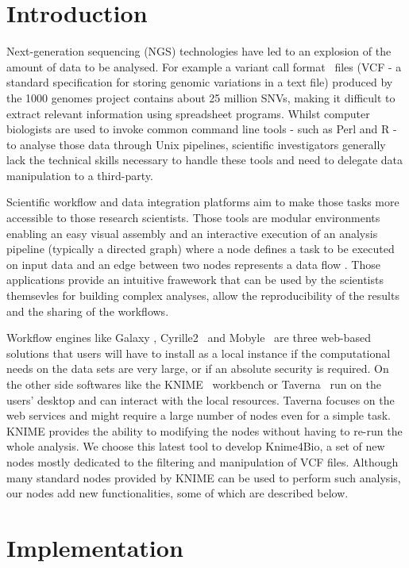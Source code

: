\documentclass{bioinfo}
\begin{document}
\section{Introduction}

Next-generation sequencing (NGS) technologies have led to an explosion of the amount of data to be analysed. For example a variant call format~\citep{pmid21653522} files (VCF - a standard specification for storing genomic variations in a text file)  produced by the 1000 genomes project contains about 25 million SNVs, making it difficult to extract relevant information using spreadsheet programs. Whilst computer biologists are used to invoke common command line tools - such as Perl and R - to analyse those data through Unix pipelines, scientific investigators generally lack the technical skills necessary to handle these tools and need to delegate data manipulation to a third-party. 

Scientific workflow and data integration platforms aim to make those tasks more accessible to those research scientists. Those tools are modular environments enabling an easy visual assembly and an interactive execution of an analysis pipeline (typically a directed graph) where a node defines a task to be executed on input data and an edge between two nodes represents a data flow . Those applications provide an intuitive frawework that can be used by the scientists themsevles for building complex analyses, allow the reproducibility of the results and the sharing of the workflows.

Workflow engines like Galaxy \citep{pmid21531983}, Cyrille2~\citep{pmid18269742} and Mobyle~\citep{pmid19689959} are three web-based solutions that users will have to install as a local instance if the computational needs on the data sets are very large, or if an absolute security is required. On the other side softwares like the KNIME~\citep{knimeref} workbench or Taverna~\citep{pmid16845108}  run on the users' desktop and can interact with the local resources. Taverna focuses on the web services and might require a large number of nodes even for a simple task. KNIME provides the ability to modifying the nodes without having to re-run the whole analysis. We choose this latest tool to develop Knime4Bio, a set of new nodes mostly dedicated to the filtering and manipulation of VCF files. Although many standard nodes provided by KNIME can be used to perform such analysis, our nodes add new functionalities, some of which are described below. 

\section{Implementation}
\end{document}
